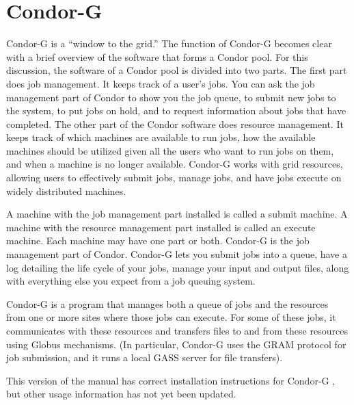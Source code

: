 
\section{\label{sec:Condor-G}Condor-G}

Condor-G is a ``window to the grid.''
The function of Condor-G becomes clear
with a brief overview of the software that forms a Condor pool.
For this discussion, the software of a Condor pool is divided
into two parts.
The first part does job management.
It keeps track of a user's jobs.
You can ask the job management part of Condor to show
you the job queue, to submit new jobs to the system,
to put jobs on hold,
and to request information about jobs that have completed.
The other part of the Condor software
does resource management.
It keeps track of which machines are available to run jobs,
how the available machines should be utilized given all the users
who want to run jobs on them,
and when a machine is no longer available.
Condor-G works with grid resources, allowing users to
effectively submit jobs, manage jobs, and have jobs execute
on widely distributed machines.

A machine with the job management part installed
is called a submit machine.
A machine with the resource management part installed 
is called an execute machine.
Each machine may have one part or both.
Condor-G is the job management part of Condor.
Condor-G lets you submit jobs into a queue,
have a log detailing the life cycle of your jobs,
manage your input and output files,
along with everything else you expect from a job queuing system.

Condor-G is a program that manages both a queue of jobs
and the resources from one or more sites where those jobs can execute. 
For some of these jobs,
it communicates with these resources and transfers files
to and from these resources using Globus mechanisms.
(In particular, Condor-G uses the GRAM protocol for job submission,
and it runs a local GASS server for file transfers).

\Note This version of the manual has correct installation instructions
for Condor-G \VersionNotice, but other usage information has not
yet been updated.





%



